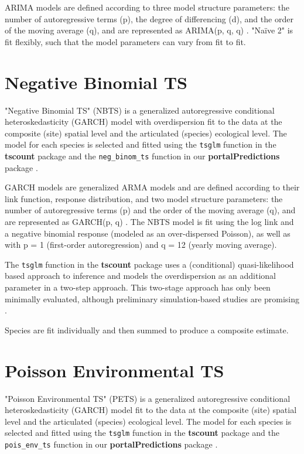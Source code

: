 \documentclass{article}
\def\code#1{\texttt{#1}}
\begin{document}
ARIMA models are defined according to three model structure parameters: the number of autoregressive terms (p), the degree of differencing (d), and the order of the moving average (q), and are represented as ARIMA(p, q, q) \cite{boxjenkins}. "Na\"{i}ve 2" is fit flexibly, such that the model parameters can vary from fit to fit.

\section{Negative Binomial TS}
\label{sec:neg_binom_ts}

"Negative Binomial TS" (NBTS) is a generalized autoregressive conditional heteroskedasticity (GARCH) model with overdispersion fit to the data at the composite (site) spatial level and the articulated (species) ecological level. The model for each species is selected and fitted using the \code{tsglm} function in the \textbf{tscount} package \cite{tscount} and the \code{neg\_binom\_ts} function in our \textbf{portalPredictions} package \cite{portalpredictions}.

GARCH models are generalized ARMA models and are defined according to their link function, response distribution, and two model structure parameters: the number of autoregressive terms (p) and the order of the moving average (q), and are represented as GARCH(p, q) \cite{tscount}. The NBTS model is fit using the log link and a negative binomial response (modeled as an over-dispersed Poisson), as well as with p = 1 (first-order autoregression) and q = 12 (yearly moving average).

The \code{tsglm} function in the \textbf{tscount} package \cite{tscount} uses a (conditional) quasi-likelihood based approach to inference and models the overdispersion as an additional parameter in a two-step approach. This two-stage approach has only been minimally evaluated, although preliminary simulation-based studies are promising \cite{tsglmvignette}.    

Species are fit individually and then summed to produce a composite estimate. 

\section{Poisson Environmental TS}
\label{sec:pois_env_ts}

"Poisson Environmental TS" (PETS) is a generalized autoregressive conditional heteroskedasticity (GARCH) model fit to the data at the composite (site) spatial level and the articulated (species) ecological level. The model for each species is selected and fitted using the \code{tsglm} function in the \textbf{tscount} package \cite{tscount} and the \code{pois\_env\_ts} function in our \textbf{portalPredictions} package \cite{portalpredictions}.
\end{document}
